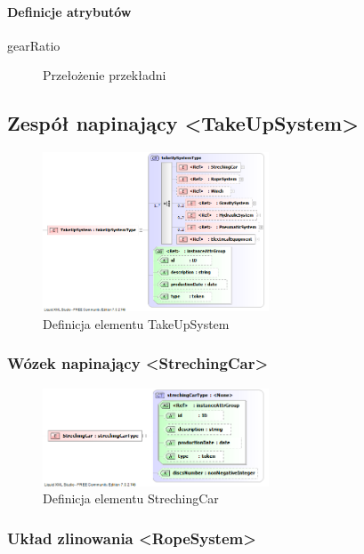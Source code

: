 \documentclass[12pt,a4paper]{article}
\begin{document}
\paragraph{Definicje atrybutów}
\begin{description}
\item[gearRatio] Przełożenie przekładni
\end{description}


\subsection{Zespół napinający <TakeUpSystem>}

\begin{figure}[h]
  \centering
  \includegraphics[width=0.6\textwidth]{png/liquid/TakeUpSystem}
  \caption{Definicja elementu TakeUpSystem}
  \label{fig:takeUpSystem-xsd}
\end{figure}


\subsubsection{Wózek napinający <StrechingCar>}

\begin{figure}[h]
  \centering
  \includegraphics[width=0.6\textwidth]{png/liquid/StrechingCar}
  \caption{Definicja elementu StrechingCar}
  \label{fig:strechingCar-xsd}
\end{figure}


\subsubsection{Układ zlinowania <RopeSystem>}
\end{document}
